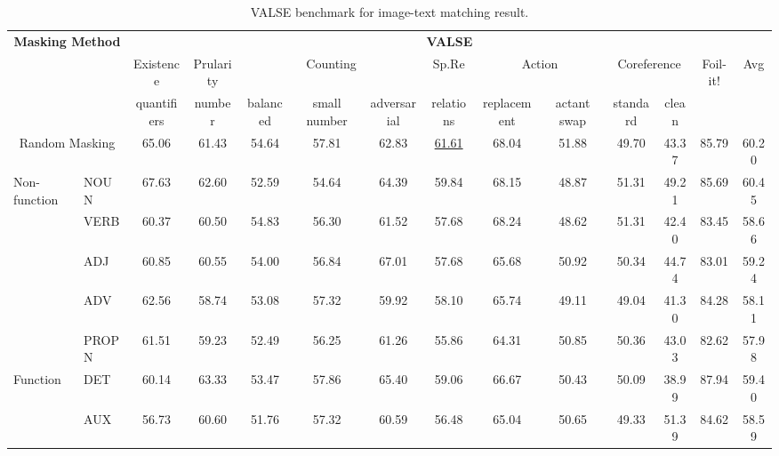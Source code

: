 \begin{table}[H]
    \centering
    \caption{VALSE benchmark for image-text matching result.}
    \label{tab:valse}
    \begin{adjustbox}{width=1\textwidth}
        \begin{tabular}{ll|c|c|ccc|c|cc|cc|c|c}
            \hline
            \multicolumn{2}{c|}{\multirow{3}{*}{\textbf{Masking Method}}} & \multicolumn{12}{c}{\textbf{VALSE}} \\
            & & Existence & Prularity & \multicolumn{3}{c|}{Counting} & Sp.Re \footnotemark & \multicolumn{2}{c|}{Action} & \multicolumn{2}{c|}{Coreference} & \multirow{2}{*}{Foil-it!} & \multirow{2}{*}{Avg} \\
            & & quantifiers & number & balanced & small number & adversarial & relations & replacement & actant swap & standard & clean & & \\
            \hline
            \multicolumn{2}{c|}{Random Masking} & 65.06 & 61.43 & 54.64 & 57.81 & 62.83 & \underline{61.61} & 68.04 & 51.88 & 49.70 & 43.37 & 85.79 & 60.20 \\
            \hline
            \multirow{5}{*}{Non-function} & NOUN & \cellcolor{green}67.63 & \cellcolor{yellow}62.60 & 52.59 & 54.64 & \cellcolor{yellow}64.39 & \cellcolor{green}59.84 & \cellcolor{yellow}68.15 & 48.87 & \cellcolor{yellow}51.31 & 49.21 & 85.69 & \cellcolor{green}60.45 \\
            & VERB & 60.37 & 60.50 & \cellcolor{green}54.83 & 56.30 & 61.52 & 57.68 & \cellcolor{green}68.24 & 48.62 & \cellcolor{yellow}51.31 & 42.40 & 83.45 & 58.66 \\
            & ADJ & 60.85 & 60.55 & \cellcolor{yellow}54.00 & 56.84 & \cellcolor{green}67.01 & 57.68 & 65.68 & \cellcolor{yellow}50.92 & 50.34 & 44.74 & 83.01 & 59.24 \\
            & ADV & 62.56 & 58.74 & 53.08 & \cellcolor{yellow}57.32 & 59.92 & 58.10 & 65.74 & 49.11 & 49.04 & 41.30 & 84.28 & 58.11 \\
            & PROPN & 61.51 & 59.23 & 52.49 & 56.25 & 61.26 & 55.86 & 64.31 & 50.85 & 50.36 & 43.03 & 82.62 & 57.98 \\
            \hline
            \multirow{4}{*}{Function} & DET & 60.14 & \cellcolor{green}63.33 & 53.47 & \cellcolor{green}57.86 & 65.40 & \cellcolor{yellow}59.06 & 66.67 & 50.43 & 50.09 & 38.99 & \cellcolor{green}87.94 & 59.40 \\
            & AUX & 56.73 & 60.60 & 51.76 & \cellcolor{yellow}57.32 & 60.59 & 56.48 & 65.04 & 50.65 & 49.33 & \cellcolor{green}51.39 & 84.62 & 58.59 \\

\end{tabular}
\end{adjustbox}
\end{table}
